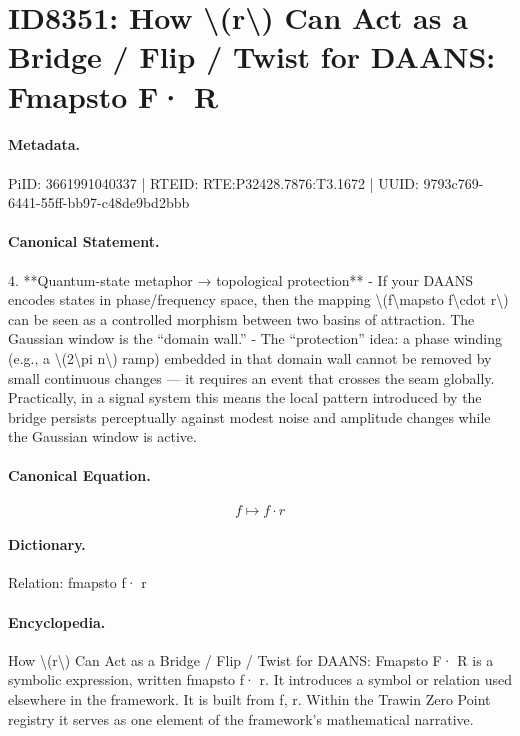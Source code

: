 \section*{ID8351: How \textbackslash{}(r\textbackslash{}) Can Act as a Bridge / Flip / Twist for DAANS: Fmapsto F· R}
\paragraph{Metadata.}
PiID: 3661991040337 | RTEID: RTE:P32428.7876:T3.1672 | UUID: 9793c769-6441-55ff-bb97-c48de9bd2bbb

\paragraph{Canonical Statement.}
4. **Quantum-state metaphor → topological protection** - If your DAANS encodes states in phase/frequency space, then the mapping \textbackslash{}(f\textbackslash{}mapsto f\textbackslash{}cdot r\textbackslash{}) can be seen as a controlled morphism between two basins of attraction. The Gaussian window is the “domain wall.” - The “protection” idea: a phase winding (e.g., a \textbackslash{}(2\textbackslash{}pi n\textbackslash{}) ramp) embedded in that domain wall cannot be removed by small continuous changes — it requires an event that crosses the seam globally. Practically, in a signal system this means the local pattern introduced by the bridge persists perceptually against modest noise and amplitude changes while the Gaussian window is active.

\paragraph{Canonical Equation.}
\[
f\mapsto f\cdot r
\]

\paragraph{Dictionary.}
Relation: fmapsto f· r

\paragraph{Encyclopedia.}
How \textbackslash{}(r\textbackslash{}) Can Act as a Bridge / Flip / Twist for DAANS: Fmapsto F· R is a symbolic expression, written fmapsto f· r. It introduces a symbol or relation used elsewhere in the framework. It is built from f, r. Within the Trawin Zero Point registry it serves as one element of the framework's mathematical narrative.
